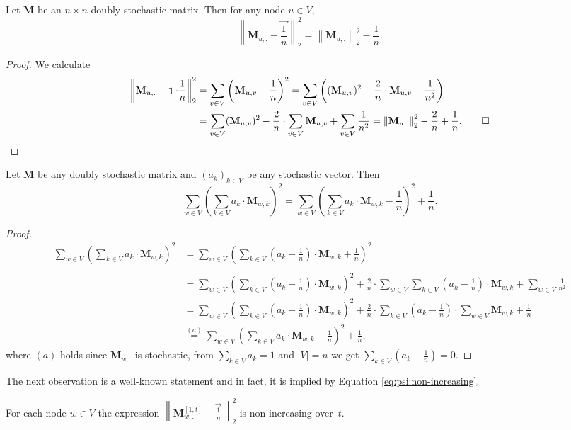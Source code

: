 \documentclass[twoside,leqno]{article}
\newcommand{\M}{\mathbf{M}}
\DeclareMathOperator{\1}{\mathbf{1}}
\numberwithin{equation}{section}
\begin{document}
\begin{observation}\label{obs:secNormExpansion}
Let $\M$ be an $n\times n$ doubly stochastic matrix. Then for any node $u\in V$,
\[
\left\|\M_{u,.} -\vec{ \frac{1}{n} } \right\|_2^2 = \left\| \M_{u,.}\right\|_2^2 - \frac{1}{n}.
\]
\end{observation}
\begin{proof} We calculate
\begin{align*}
\left\|\M_{u,.} -\1\cdot \frac{1}{n}\right\|_2^2 &= \sum_{v\in V} \left(\M_{u,v}-\frac{1}{n}\right)^2 = \sum_{v\in V} \left((\M_{u,v})^2 -\frac{2}{n}\cdot \M_{u,v} - \frac{1}{n^2}\right)
\\&= \sum_{v\in V} (\M_{u,v})^2 - \frac{2}{n}\cdot \sum_{v\in V} \M_{u,v} + \sum_{v\in V} \frac{1}{n^2} = \left\| \M_{u,.}\right\|_2^2 - \frac{2}{n} + \frac{1}{n}. \qed
\end{align*}
\end{proof}






\begin{observation}\label{obs:inter:secondNormBound}
Let $\M$ be any doubly stochastic matrix and $\left(a_k\right)_{k\in V}$ be any stochastic vector. Then
\[\sum_{w\in V} \left(\sum_{k \in V} a_k\cdot \M_{w,k} \right)^2 = \sum_{w\in V} \left(\sum_{k \in V} a_k\cdot \M_{w,k} -\frac{1}{n} \right)^2 + \frac{1}{n}.\]
\end{observation}
\begin{proof}
\begin{align*}
\sum_{w\in V}\left(\sum_{k\in V} a_k\cdot \M_{w,k}\right)^2 &= \sum_{w\in V}\left(\sum_{k\in V} \left(a_k-\frac{1}{n}\right)\cdot \M_{w,k}+\frac{1}{n}\right)^2
\\
\\&= \sum_{w\in V} \left(\sum_{k\in V} \left(a_k-\frac{1}{n}\right)\cdot \M_{w,k} \right)^2 +
\frac{2}{n}\cdot \sum_{w\in V}\sum_{k\in V} \left(a_k-\frac{1}{n}\right)\cdot \M_{w,k} + \sum_{w\in V} \frac{1}{n^2}
\\& =\sum_{w\in V} \left(\sum_{k\in V} \left(a_k-\frac{1}{n}\right)\cdot \M_{w,k} \right)^2 +
\frac{2}{n}\cdot  \sum_{k\in V} \left(a_k-\frac{1}{n}\right)\cdot \sum_{w\in V} \M_{w,k} + \frac{1}{n}
\\
& \stackrel{(a)}{=} \sum_{w\in V} \left( \sum_{k\in V} a_k\cdot \M_{w,k} -\frac{1}{n}\right)^2 + \frac{1}{n},
\end{align*}
where $(a)$ holds since $\M_{w,.}$ is stochastic, from $\sum_{k\in V} a_k=1$ and $|V|=n$ we get $\sum_{k\in V} \left(a_k-\frac{1}{n}\right)=0$.
\end{proof}
The next observation is a well-known statement and in fact, it is implied by Equation \cref{eq:psi:non-increasing}.
\begin{observation} \label{monotone}
For each node $w\in V$ the expression $\left\|\M^{[1,t]}_{w,.}-\vec{ \frac{1}{n}}\right\|_2^2$ is non-increasing over~$t$. 
\end{observation}
\end{document}
